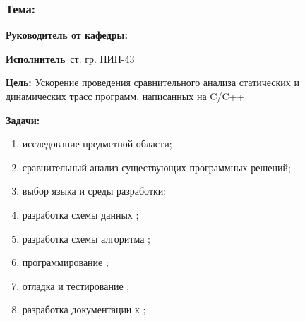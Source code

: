 \begin{frame}
\frametitle{\textbf{Тема:~\thesisTitle}}
\textbf{Руководитель от кафедры:}~\supervisorRegaliaShort~\supervisorFioShort

\textbf{Исполнитель}~ст. гр. ПИН-43~\thesisAuthorShort

\textbf{Цель:} Ускорение проведения сравнительного анализа статических и динамических трасс программ, написанных на C/C++

\textbf{Задачи:}
\begin{enumerate}
    \item исследование предметной области;
    \item сравнительный анализ существующих программных решений;
    \item выбор языка и среды разработки;
    \item разработка схемы данных {\ProgModule};
    \item разработка схемы алгоритма {\ProgModule};
    \item программирование {\ProgModule};
    \item отладка и тестирование {\ProgModule};
    \item разработка документации к {\ProgModule};
\end{enumerate}
\end{frame}
